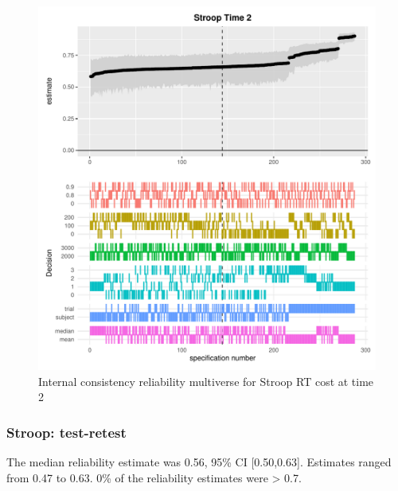 \documentclass[
  man,floatsintext]{apa6}
\begin{document}
\begin{figure}
\centering
\includegraphics{Reliability_Multiverse_files/figure-latex/unnamed-chunk-6-1.pdf}
\caption{\label{fig:unnamed-chunk-6}Internal consistency reliability multiverse for Stroop RT cost at time 2}
\end{figure}

\newpage

\hypertarget{stroop-test-retest}{%
\subsubsection{Stroop: test-retest}\label{stroop-test-retest}}

The median reliability estimate was 0.56, 95\% CI {[}0.50,0.63{]}. Estimates ranged from 0.47 to 0.63. 0\% of the reliability estimates were \textgreater{} 0.7.
\end{document}
